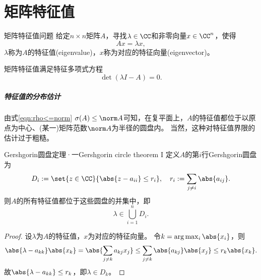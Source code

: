 \chapter{矩阵特征值}
\label{chap:eigenvalue}

\begin{definition}
    {矩阵特征值问题}{}
    给定$n\times n$矩阵$A$，寻找$\lambda\in\CC$和非零向量$x\in\CC^n$，使得
    \begin{equation}
        Ax=\lambda x,
    \end{equation}
    $\lambda$称为$A$的特征值(eigenvalue)，$x$称为对应的特征向量(eigenvector)。
\end{definition}

\begin{corollary}
    矩阵特征值满足特征多项式方程
    \begin{equation}
        \det(\lambda I-A)=0.
    \end{equation}
\end{corollary}

\paragraph{特征值的分布估计}

由式\eqref{eqn:rho<=norm} $\sigma(A)\leq\norm A$可知，在复平面上，$A$的特征值都位于以原点为中心、(某一)矩阵范数$\norm A$为半径的圆盘内。
当然，这种对特征值界限的估计过于粗糙。

\begin{theorem}
    {Gershgorin圆盘定理·一}{Gershgorin circle theorem I}
    定义$A$的第$i$行Gershgorin圆盘为
    \begin{equation}
        D_i:=\set{z\in\CC}{\abs{z-a_{ii}}\leq r_i},\quad r_i:=\sum_{j\neq i}\abs{a_{ij}}.
    \end{equation}
    则$A$的所有特征值都位于这些圆盘的并集中，即
    \begin{equation}
        \lambda\in\bigcup_{i=1}^nD_i.
    \end{equation}
\end{theorem}

\begin{proof}
    设$\lambda$为$A$的特征值，$x$为对应的特征向量。
    令$k=\arg\max_i\abs{x_i}$，则
    \[
        \abs{\lambda - a_{kk}}\abs{x_k}=\abs{\sum_{j\neq k}a_{kj}x_j}\leq\sum_{j\neq k}\abs{a_{kj}}\abs{x_j}\leq r_k\abs{x_k}.
    \]
    故$\abs{\lambda - a_{kk}}\leq r_k$，即$\lambda\in D_k$。
\end{proof}


